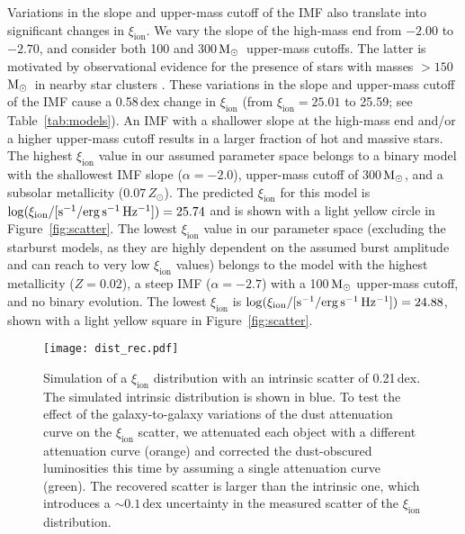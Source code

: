 \documentclass[iop]{emulateapj}
\newcommand{\xiion}{\ensuremath{\xi_{\mathrm{ion}}}}
\def\msun{${\rm M_\odot}$}
\begin{document}
Variations in the slope and upper-mass cutoff of the IMF also translate into significant changes in {\xiion}. We vary the slope of the high-mass end from $-2.00$ to $-2.70$, and consider both 100 and 300\,\msun~upper-mass cutoffs. The latter is motivated by observational evidence for the presence of stars with masses $> 150$\,\msun~in nearby star clusters \citep{crowther10,smith16}. These variations in the slope and upper-mass cutoff of the IMF cause a 0.58\,dex change in {\xiion} (from {\xiion}$= 25.01$ to 25.59; see Table~\ref{tab:models}).
An IMF with a shallower slope at the high-mass end and/or a higher upper-mass cutoff results in a larger fraction of hot and massive stars. The highest {\xiion} value in our assumed parameter space belongs to a binary model with the shallowest IMF slope ($\alpha = -2.0$), upper-mass cutoff of 300\,\msun, and a subsolar metallicity ($0.07\,Z_{\odot}$). The predicted {\xiion} for this model is $\log(\xi_{\rm{ion}}/[{\rm{s^{-1}/erg\,s^{-1}\,Hz^{-1}}}])=25.74$ and is shown with a light yellow circle in Figure~\ref{fig:scatter}.
The lowest {\xiion} value in our parameter space (excluding the starburst models, as they are highly dependent on the assumed burst amplitude and can reach to very low {\xiion} values) belongs to the model with the highest metallicity ($Z=0.02$), a steep IMF ($\alpha=-2.7$) with a 100\,{\msun} upper-mass cutoff, and no binary evolution. The lowest {\xiion} is $\log(\xi_{\rm{ion}}/[{\rm{s^{-1}/erg\,s^{-1}\,Hz^{-1}}}])=24.88$, shown with a light yellow square in Figure~\ref{fig:scatter}. 

\begin{figure}[tbp]
	\centering
		\texttt{[image: dist\_rec.pdf]}
		\caption{Simulation of a {\xiion} distribution with an intrinsic scatter of 0.21\,dex. The simulated intrinsic distribution is shown in blue. To test the effect of the galaxy-to-galaxy variations of the dust attenuation curve on the {\xiion} scatter, we attenuated each object with a different attenuation curve (orange) and corrected the dust-obscured luminosities this time by assuming a single attenuation curve (green). The recovered scatter is larger than the intrinsic one, which introduces a $\sim 0.1$\,dex uncertainty in the measured scatter of the {\xiion} distribution.
		}
		\label{fig:dustsim}
\end{figure}
\end{document}

